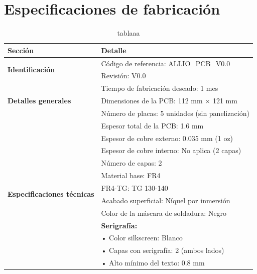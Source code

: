 \documentclass{reporti}
\begin{document}
\section{Especificaciones de fabricación}
\begin{table}[H]
  \caption{tablaaa}
  \centering
  \begin{tabularx}{\textwidth}{lX}
    \toprule
    \textbf{Sección} & \textbf{Detalle} \\
    \midrule

    \multirow{2}{*}{\textbf{Identificación}} 
    & Código de referencia: ALLIO\_PCB\_V0.0 \\
    & Revisión: V0.0 \\
    \cmidrule(lr){1-2}

    \multirow{3}{*}{\textbf{Detalles generales}} 
    & Tiempo de fabricación deseado: 1 mes \\
    & Dimensiones de la PCB: 112 mm × 121 mm \\
    & Número de placas: 5 unidades (sin panelización) \\
    \cmidrule(lr){1-2}

    \multirow{12}{*}{\textbf{Especificaciones técnicas}} 
    & Espesor total de la PCB: 1.6 mm \\
    & Espesor de cobre externo: 0.035 mm (1 oz) \\
    & Espesor de cobre interno: No aplica (2 capas) \\
    & Número de capas: 2 \\
    & Material base: FR4 \\
    & FR4-TG: TG 130-140 \\
    & Acabado superficial: Níquel por inmersión \\
    & Color de la máscara de soldadura: Negro \\
    & \textbf{Serigrafía:} \\
    & \quad • Color silkscreen: Blanco \\
    & \quad • Capas con serigrafía: 2 (ambos lados) \\
    & \quad • Alto mínimo del texto: 0.8 mm \\
    \cmidrule(lr){1-2}


\end{tabularx}
\end{table}
\end{document}
